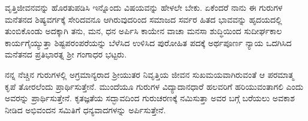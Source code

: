 {ವೃತ್ತಿಜೀವನವನ್ನು ಹೊರತುಪಡಿಸಿ ಇನ್ನೊಂದು ವಿಷಯವನ್ನು ಹೇಳಲೇ ಬೇಕು. ಏಕೆಂದರೆ ನಾನು ಈ ಗುರುಗಳ ಮನೆತನದ ಶಿಷ್ಯವರ್ಗಕ್ಕೆ ಸೇರಿದವನೂ ಆಗಿರುವುದರಿಂದ ಸಮಾಜದ ಸರ್ವರ ಹಿತದ ಭಾವವನ್ನು ಹೃದಯದಲ್ಲಿ ತುಂಬಿಕೊಂಡು ಅದಕ್ಕಾಗಿ ತನು, ಮನ, ಧನ ಅರ್ಪಿಸಿ ಕಾಯೇನ ವಾಚಾ ಮನಸಾ ಶುದ್ಧಿಯಿಂದ ಸುದೀರ್ಘಕಾಲ ಕಾರ್ಯಗೈಯ್ಯುತ್ತಾ ಶಿಷ್ಟಪರಂಪರೆಯನ್ನು ಬೆಳೆಸಿದ ಉಳಿಸಿದ ಪುರೋಹಿತ ಪದಕ್ಕೆ ಅರ್ಥಪೂರ್ಣ ನ್ಯಾಯ ಒದಗಿಸಿದ ಮನೆತನದ ಪ್ರತಿಭಾರತ್ನ ಶ್ರೀ ಗಂಗಾಧರ ಭಟ್ಟರು. 

ನನ್ನ ನೆಚ್ಚಿನ ಗುರುಗಳಲ್ಲಿ ಅಗ್ರಮಾನ್ಯರಾದ ಶ್ರೀಯುತರ ನಿವೃತ್ತಿಯ ಜೀವನ ಸುಖಮಯವಾಗಿರುವಂತೆ ಆ ಪರಮಾತ್ಮ ಕೃಪೆ ತೋರಲೆಂದು ಪ್ರಾರ್ಥಿಸುತ್ತೇನೆ. ಮುಂದೆಯೂ ಗುರುಗಳ ವಿದ್ಯಾದಾನಧಾರೆ  ಹಲವರಿಗೆ ಹರಿಯುವಂತಾಗಲಿ ಎಂದು ಅವರನ್ನು ಪ್ರಾರ್ಥಿಸುತ್ತೇನೆ. ಕೃತಜ್ಞತೆಯ ಸದ್ಭಾವದಿಂದ ಗುರುಚರಣಕ್ಕೆ ನಮಿಸುತ್ತಾ ಅವರ ಬಗ್ಗೆ ಬರೆಯಲು ಅವಕಾಶ ನೀಡಿದ ಅಭಿವಂದನ ಸಮಿತಿಗೆ ಧನ್ಯವಾದಗಳನ್ನು ಅರ್ಪಿಸುತ್ತೇನೆ.

\smallskip
\centerline{{\fontsize{10}{12}\selectfont{}\quad{}\quad{}}}
}
